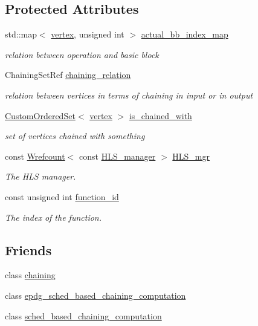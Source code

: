 \subsection*{Protected Attributes}
\begin{DoxyCompactItemize}
\item 
std\+::map$<$ \hyperlink{graph_8hpp_abefdcf0544e601805af44eca032cca14}{vertex}, unsigned int $>$ \hyperlink{classChainingInformation_a2c097f4799285053ee13f55e6ad362e7}{actual\+\_\+bb\+\_\+index\+\_\+map}
\begin{DoxyCompactList}\small\item\em relation between operation and basic block \end{DoxyCompactList}\item 
Chaining\+Set\+Ref \hyperlink{classChainingInformation_a545635d444ebb7543ffef61b3f11bb0e}{chaining\+\_\+relation}
\begin{DoxyCompactList}\small\item\em relation between vertices in terms of chaining in input or in output \end{DoxyCompactList}\item 
\hyperlink{classCustomOrderedSet}{Custom\+Ordered\+Set}$<$ \hyperlink{graph_8hpp_abefdcf0544e601805af44eca032cca14}{vertex} $>$ \hyperlink{classChainingInformation_a83d7fa1a525b444cee4f71b361c8d748}{is\+\_\+chained\+\_\+with}
\begin{DoxyCompactList}\small\item\em set of vertices chained with something \end{DoxyCompactList}\item 
const \hyperlink{classWrefcount}{Wrefcount}$<$ const \hyperlink{classHLS__manager}{H\+L\+S\+\_\+manager} $>$ \hyperlink{classChainingInformation_a47af998080762385042e518b2605a5da}{H\+L\+S\+\_\+mgr}
\begin{DoxyCompactList}\small\item\em The H\+LS manager. \end{DoxyCompactList}\item 
const unsigned int \hyperlink{classChainingInformation_af6b3dc65f580c0e11c3e7ec52ab9f852}{function\+\_\+id}
\begin{DoxyCompactList}\small\item\em The index of the function. \end{DoxyCompactList}\end{DoxyCompactItemize}
\subsection*{Friends}
\begin{DoxyCompactItemize}
\item 
class \hyperlink{classChainingInformation_a7e8da19f51fdf799b828cbba606659a0}{chaining}
\item 
class \hyperlink{classChainingInformation_af50e06247a1defeb16375345a18b30a2}{epdg\+\_\+sched\+\_\+based\+\_\+chaining\+\_\+computation}
\item 
class \hyperlink{classChainingInformation_a202bca3d51acbbaee5b99ea1fed96ad4}{sched\+\_\+based\+\_\+chaining\+\_\+computation}
\end{DoxyCompactItemize}


